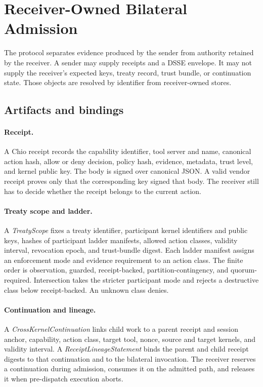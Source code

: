 \section{Receiver-Owned Bilateral Admission}
\label{sec:design}

The protocol separates evidence produced by the sender from authority retained by the receiver. A sender may supply receipts and a DSSE envelope. It may not supply the receiver's expected keys, treaty record, trust bundle, or continuation state. Those objects are resolved by identifier from receiver-owned stores.

\subsection{Artifacts and bindings}

\paragraph{Receipt.}
A Chio receipt records the capability identifier, tool server and name, canonical action hash, allow or deny decision, policy hash, evidence, metadata, trust level, and kernel public key. The body is signed over canonical JSON. A valid vendor receipt proves only that the corresponding key signed that body. The receiver still has to decide whether the receipt belongs to the current action.

\paragraph{Treaty scope and ladder.}
A \emph{TreatyScope} fixes a treaty identifier, participant kernel identifiers and public keys, hashes of participant ladder manifests, allowed action classes, validity interval, revocation epoch, and trust-bundle digest. Each ladder manifest assigns an enforcement mode and evidence requirement to an action class. The finite order is observation, guarded, receipt-backed, partition-contingency, and quorum-required. Intersection takes the stricter participant mode and rejects a destructive class below receipt-backed. An unknown class denies.

\paragraph{Continuation and lineage.}
A \emph{CrossKernelContinuation} links child work to a parent receipt and session anchor, capability, action class, target tool, nonce, source and target kernels, and validity interval. A \emph{ReceiptLineageStatement} binds the parent and child receipt digests to that continuation and to the bilateral invocation. The receiver reserves a continuation during admission, consumes it on the admitted path, and releases it when pre-dispatch execution aborts.


